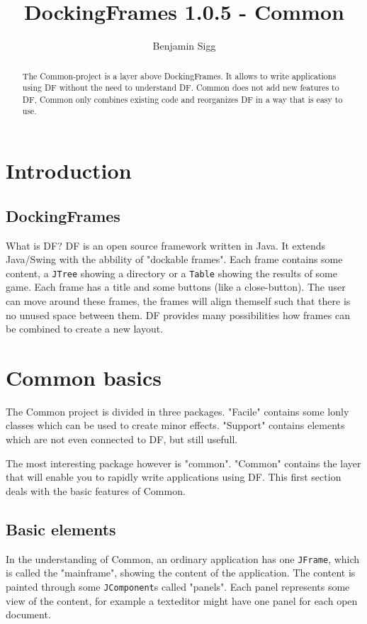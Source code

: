 \documentclass[a4paper,10pt]{article}
\title{DockingFrames 1.0.5 - Common}
\author{Benjamin Sigg}
\newcommand{\src}[1]{\lstinline[basicstyle=\ttfamily]|#1|}
\begin{document}
\maketitle
\tableofcontents
\newpage

\begin{abstract}
The Common-project is a layer above DockingFrames. It allows to write applications using DF without the need to understand DF. Common does not add new features to DF, Common only combines existing code and reorganizes DF in a way that is easy to use.
\end{abstract}

\section{Introduction}
\subsection{DockingFrames}
What is DF? DF is an open source framework written in Java. It extends Java/Swing with the abbility of "dockable frames". Each frame contains some content, a \src{JTree} showing a directory or a \src{Table} showing the results of some game. Each frame has a title and some buttons (like a close-button). The user can move around these frames, the frames will align themself such that there is no unused space between them. DF provides many possibilities how frames can be combined to create a new layout.

\section{Common basics}
The Common project is divided in three packages. "Facile" contains some lonly classes which can be used to create minor effects. "Support" contains elements which are not even connected to DF, but still usefull.

The most interesting package however is "common". "Common" contains the layer that will enable you to rapidly write applications using DF. This first section deals with the basic features of Common.

\subsection{Basic elements}
In the understanding of Common, an ordinary application has one \src{JFrame}, which is called the "mainframe", showing the content of the application. The content is painted through some \src{JComponent}s called "panels". Each panel represents some view of the content, for example a texteditor might have one panel for each open document.
\end{document}
